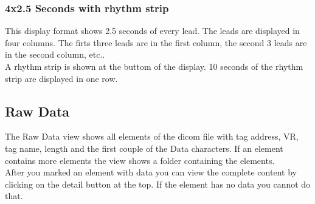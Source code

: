 		\subsubsection{4x2.5 Seconds with rhythm strip}
		This display format shows 2.5 seconds of every lead. The leads are displayed
		in four columns. The firts three leads are in the first column, the second 3
		leads are in the second column, etc..\\
		A rhythm strip is shown at the buttom of the display. 10 seconds of the rhythm
		strip are displayed in one row. \\
		
		\begin{minipage}{\textwidth} 
		\centering
		\label{fig:bild}
		\end{minipage}

	\subsection{Raw Data}
	The Raw Data view shows all elements of the dicom file with tag address, VR,
	tag name, length and the first couple of the Data characters.
	If an element contains more elements the view shows a folder containing the
	elements.\\
	After you marked an element with data you can view the complete content
	by clicking on the detail button at the top. If the element has no data you
	cannot do that.\\
	
	\begin{minipage}{\textwidth} 
	\centering
	\label{fig:bild}
	\end{minipage}
		
